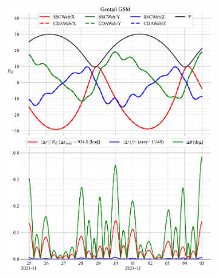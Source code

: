 \documentclass[draft]{agujournal2019}
\begin{document}
\begin{figure}[h]
\begin{subfigure}[b]{0.49\textwidth}
         \includegraphics[width=\textwidth]{figures/Geotail_GSM_SSCWeb_vs_CDAWeb.pdf}
     \end{subfigure}
     \begin{subfigure}[b]{0.49\textwidth}
         \centering

\end{subfigure}
\end{figure}
\end{document}
